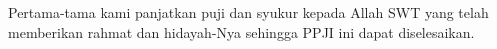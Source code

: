 \begin{acknowledgements}
Pertama-tama kami panjatkan puji dan syukur kepada Allah SWT yang telah memberikan rahmat dan hidayah-Nya sehingga PPJI ini dapat diselesaikan.
\end{acknowledgements}